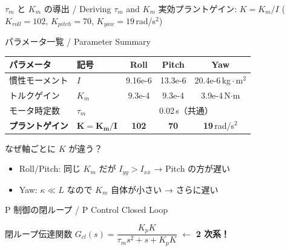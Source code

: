 \documentclass[aspectratio=169, 14pt]{beamer}
\begin{document}
\begin{frame}{$\tau_m$ と $K_m$ の導出 / Deriving $\tau_m$ and $K_m$}
  \vspace{0.5em}
  \centering
  実効プラントゲイン: \; $K = K_m / I$
  \quad ($K_{roll}\!=\!102$,\; $K_{pitch}\!=\!70$,\; $K_{yaw}\!=\!19$\,rad/s$^2$)
\end{frame}

\begin{frame}{パラメータ一覧 / Parameter Summary}
  \begin{table}
    \centering
    \begin{tabular}{llccc}
      \hline
      \textbf{パラメータ} & \textbf{記号} & \textbf{Roll} & \textbf{Pitch} & \textbf{Yaw} \\
      \hline
      慣性モーメント & $I$ & 9.16e-6 & 13.3e-6 & 20.4e-6\,kg\,$\cdot$\,m$^2$ \\
      トルクゲイン & $K_m$ & 9.3e-4 & 9.3e-4 & 3.9e-4\,N$\cdot$m \\
      モータ時定数 & $\tau_m$ & \multicolumn{3}{c}{0.02\,s（共通）} \\
      \hline
      \textbf{プラントゲイン} & $\bm{K = K_m/I}$
        & \textbf{102} & \textbf{70} & \textbf{19}\,rad/s$^2$ \\
      \hline
    \end{tabular}
  \end{table}

  \vspace{0.5em}

  \begin{exampleblock}{なぜ軸ごとに $K$ が違う？}
    \begin{itemize}
      \item Roll/Pitch: 同じ $K_m$ だが $I_{yy} > I_{xx}$ → Pitch の方が遅い
      \item Yaw: $\kappa \ll L$ なので $K_m$ 自体が小さい → さらに遅い
    \end{itemize}
  \end{exampleblock}
\end{frame}

\begin{frame}{P 制御の閉ループ / P Control Closed Loop}
  \begin{center}
    \vspace{-2mm}
    \resizebox{0.85\textwidth}{!}{}
  \end{center}

  \vspace{-0.5em}

  \begin{block}{閉ループ伝達関数}
    $G_{cl}(s) = \dfrac{K_p K}{\tau_m s^2 + s + K_p K}$
    \hfill $\longleftarrow$ \textbf{2 次系！}
  \end{block}
\end{frame}
\end{document}
